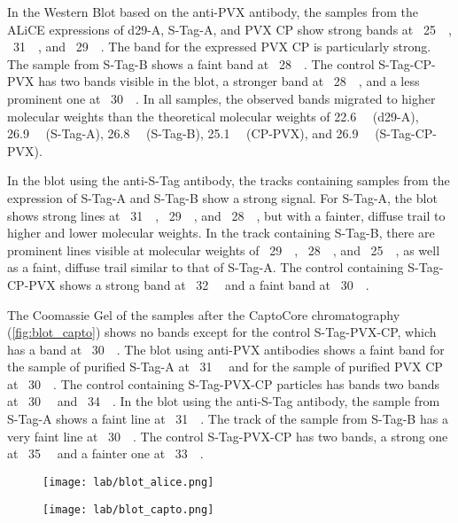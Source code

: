 In the Western Blot based on the anti-PVX antibody, the samples from the ALiCE expressions of d29-A, S-Tag-A, and PVX CP show strong bands at ~\SI{25}{\kilo\Dalton}, ~\SI{31}{\kilo\Dalton}, and ~\SI{29}{\kilo\Dalton}. The band for the expressed PVX CP is particularly strong. The sample from S-Tag-B shows a faint band at ~\SI{28}{\kilo\Dalton}. The control S-Tag-CP-PVX has two bands visible in the blot, a stronger band at ~\SI{28}{\kilo\Dalton}, and a less prominent one at ~\SI{30}{\kilo\Dalton}. In all samples, the observed bands migrated to higher molecular weights than the theoretical molecular weights of \SI{22.6}{\kilo\Dalton} (d29-A), \SI{26.9}{\kilo\Dalton} (S-Tag-A), \SI{26.8}{\kilo\Dalton} (S-Tag-B), \SI{25.1}{\kilo\Dalton} (CP-PVX), and \SI{26.9}{\kilo\Dalton} (S-Tag-CP-PVX).

In the blot using the anti-S-Tag antibody, the tracks containing samples from the expression of S-Tag-A and S-Tag-B show a strong signal. For S-Tag-A, the blot shows strong lines at ~\SI{31}{\kilo\Dalton}, ~\SI{29}{\kilo\Dalton}, and ~\SI{28}{\kilo\Dalton}, but with a fainter, diffuse trail to higher and lower molecular weights. In the track containing S-Tag-B, there are prominent lines visible at molecular weights of ~\SI{29}{\kilo\Dalton}, ~\SI{28}{\kilo\Dalton}, and ~\SI{25}{\kilo\Dalton}, as well as a faint, diffuse trail similar to that of S-Tag-A. The control containing S-Tag-CP-PVX shows a strong band at ~\SI{32}{\kilo\Dalton} and a faint band at ~\SI{30}{\kilo\Dalton}.

The Coomassie Gel of the samples after the CaptoCore chromatography (\autoref{fig:blot_capto}) shows no bands except for the control S-Tag-PVX-CP, which has a band at ~\SI{30}{\kilo\Dalton}. The blot using anti-PVX antibodies shows a faint band for the sample of purified S-Tag-A at ~\SI{31}{\kilo\Dalton} and for the sample of purified PVX CP at ~\SI{30}{\kilo\Dalton}. The control containing S-Tag-PVX-CP particles has bands two bands at ~\SI{30}{\kilo\Dalton} and ~\SI{34}{\kilo\Dalton}. In the blot using the anti-S-Tag antibody, the sample from S-Tag-A shows a faint line at ~\SI{31}{\kilo\Dalton}. The track of the sample from S-Tag-B has a very faint line at ~\SI{30}{\kilo\Dalton}. The control S-Tag-PVX-CP has two bands, a strong one at ~\SI{35}{\kilo\Dalton} and a fainter one at ~\SI{33}{\kilo\Dalton}. 


\begin{figure}
\texttt{[image: lab/blot\_alice.png]}
\caption{}
\label{fig:blot_alice}
\end{figure}
\begin{figure}
\texttt{[image: lab/blot\_capto.png]}
\caption{}
\label{fig:blot_capto}
\end{figure}


